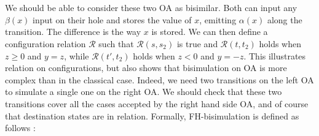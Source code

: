 \documentclass[runningheads]{llncs}
\begin{document}
\noindent~
\hfill
{}~

We should be able to consider these two OA as bisimilar. Both can input any $\beta(x)$ input on their hole and stores the value of $x$, emitting $\alpha(x)$ along the transition.
The difference is the way $x$ is stored. We can then define a configuration relation $\mathcal{R}$ such that $\mathcal{R}(s,s_2)$ is true and $\mathcal{R}(t,t_2)$ holds when $z\geq 0$ and $y=z$, while $\mathcal{R}(t',t_2)$ holds when $z< 0$ and $y=-z$. This illustrates relation on configurations, but also shows that bisimulation on OA is more complex than in the classical case. Indeed, we need two transitions on the left OA to simulate a single one on the right OA. We should check that these two transitions cover all the cases accepted by the right hand side OA, and of course that destination states are in relation. Formally, FH-bisimulation is defined as follows \cite{AMHEEMA:2023}:
\end{document}
